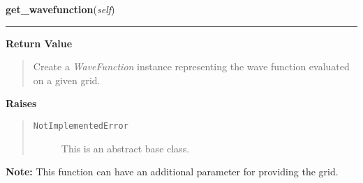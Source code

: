 \hspace{.8\funcindent}\begin{boxedminipage}{\funcwidth}

    \raggedright \textbf{get\_wavefunction}(\textit{self})

    \vspace{-1.5ex}

    \rule{\textwidth}{0.5\fboxrule}
\setlength{\parskip}{2ex}
\setlength{\parskip}{1ex}
      \textbf{Return Value}
    \vspace{-1ex}

      \begin{quote}
      Create a \textit{WaveFunction} instance representing the wave function
      evaluated on a given grid.

      \end{quote}

      \textbf{Raises}
    \vspace{-1ex}

      \begin{quote}
        \begin{description}

          \item[\texttt{NotImplementedError}]

          This is an abstract base class.

        \end{description}

      \end{quote}

\textbf{Note:} This function can have an additional parameter for providing the grid.



    \end{boxedminipage}

    \label{Propagator:Propagator:propagate}

    \vspace{0.5ex}

